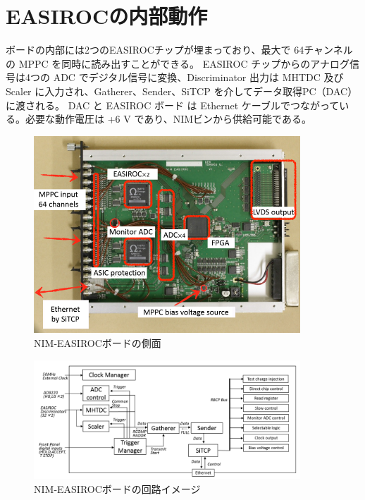 \documentclass[a4paper]{report}
\begin{document}
\section{EASIROCの内部動作}
ボードの内部には2つのEASIROCチップが埋まっており、最大で 64チャンネルの MPPC を同時に読み出すことができる。
EASIROC チップからのアナログ信号は4つの ADC でデジタル信号に変換、Discriminator 出力は MHTDC 及び Scaler に入力され、Gatherer、Sender、SiTCP を介してデータ取得PC（DAC）に渡される。
DAC と EASIROC ボード は Ethernet ケーブルでつながっている。必要な動作電圧は +6 V であり、NIMビンから供給可能である。
\begin{figure}[H]
\begin{center}
\includegraphics[width = 10.0cm, bb= 0 0 735 544]{2.png}
\end{center}
\caption{NIM-EASIROCボードの側面}
\label{fig:}
\end{figure}

\begin{figure}[H]
\begin{center}
\includegraphics[width = 10.0cm, bb= 0 0 952 424]{3.png}
\end{center}
\caption{NIM-EASIROCボードの回路イメージ}
\label{fig:}
\end{figure}
\end{document}
